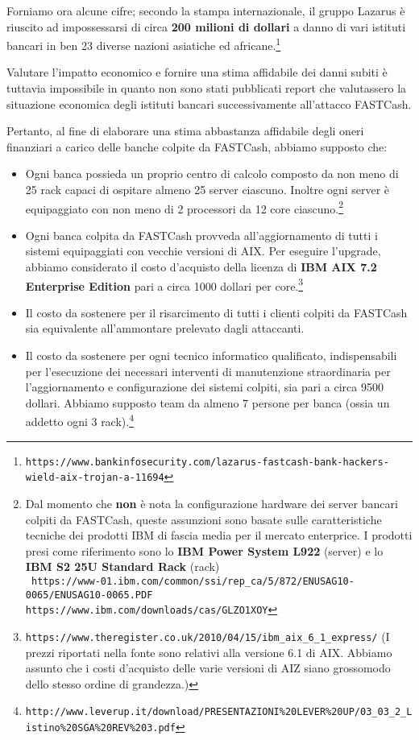 \documentclass[10pt,a4paper, titlepage]{report}
\begin{document}
Forniamo ora alcune cifre; secondo la stampa internazionale, il gruppo Lazarus è riuscito ad impossessarsi di circa \textbf{200 milioni di dollari} a danno di vari istituti bancari in ben 23 diverse nazioni asiatiche ed africane.\footnote{\texttt{https://www.bankinfosecurity.com/lazarus-fastcash-bank-hackers-wield-aix-trojan-a-11694}}

Valutare l'impatto economico e fornire una stima affidabile dei danni subiti è tuttavia impossibile in quanto non sono stati pubblicati report che valutassero la situazione economica degli istituti bancari successivamente all'attacco FASTCash. 

Pertanto, al fine di elaborare una stima abbastanza affidabile degli oneri finanziari a carico delle banche colpite da FASTCash, abbiamo supposto che:

\begin{itemize}
\item Ogni banca possieda un proprio centro di calcolo composto da non meno di 25 rack capaci di ospitare almeno 25 server ciascuno. Inoltre ogni server è equipaggiato con non meno di 2 processori da 12 core ciascuno.\footnote{Dal momento che \textbf{non} è nota la configurazione hardware dei server bancari colpiti da FASTCash, queste assunzioni sono basate sulle caratteristiche tecniche dei prodotti IBM di fascia media per il mercato enterprice. I prodotti presi come riferimento sono lo \textbf{IBM Power System L922} (server) e lo \textbf{IBM S2 25U Standard Rack} (rack) \\ \texttt{ https://www-01.ibm.com/common/ssi/rep\_ca/5/872/ENUSAG10-0065/ENUSAG10-0065.PDF} \\ \texttt{https://www.ibm.com/downloads/cas/GLZO1XOY}}
\item Ogni banca colpita da FASTCash provveda all'aggiornamento di tutti i sistemi equipaggiati con vecchie versioni di AIX. Per eseguire l'upgrade, abbiamo considerato il costo d'acquisto della licenza di \textbf{IBM AIX 7.2 Enterprise Edition} pari a circa 1000 dollari per core.\footnote{\texttt{https://www.theregister.co.uk/2010/04/15/ibm\_aix\_6\_1\_express/} (I prezzi riportati nella fonte sono relativi alla versione 6.1 di AIX. Abbiamo assunto che i costi d'acquisto delle varie versioni di AIZ siano grossomodo dello stesso ordine di grandezza.)}
\item Il costo da sostenere per il risarcimento di tutti i clienti colpiti da FASTCash sia equivalente all'ammontare prelevato dagli attaccanti.
\item Il costo da sostenere per ogni tecnico informatico qualificato, indispensabili per l'esecuzione dei necessari interventi di manutenzione straordinaria per l'aggiornamento e configurazione dei sistemi colpiti, sia pari a circa 9500 dollari. Abbiamo supposto team da almeno 7 persone per banca (ossia un addetto ogni 3 rack).\footnote{\texttt{http://www.leverup.it/download/PRESENTAZIONI\%20LEVER\%20UP/03\_03\_2\_Listino\%20SGA\%20REV\%203.pdf}}
\end{itemize}
\end{document}
